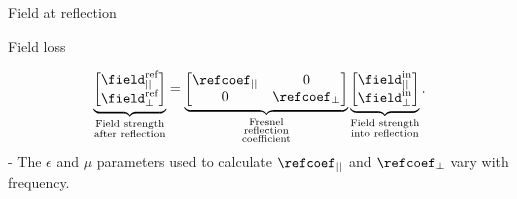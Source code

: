 \documentclass[8pt]{beamer}
\begin{document}
\begin{frame}{Field at reflection}
\begin{block}{Field loss}
\begin{minipage}{\twocols}
\begin{equation*}
\underbrace{\begin{bmatrix}
\field^{\text{ref}}_{||} \\ \field^{\text{ref}}_{\perp}
\end{bmatrix}}_{\substack{\text{Field strength} \\ \text{after reflection}}}=\underbrace{
\begin{bmatrix} \refcoef_{||} & 0 \\ 0 & \refcoef_{\perp}  \end{bmatrix}}_{\substack{\text{Fresnel} \\ \text{reflection} \\ \text{coefficient}}}\underbrace{\begin{bmatrix} \field^{\text{in}}_{||} \\ \field^{\text{in}}_{\perp}
\end{bmatrix}}_{\substack{\text{Field strength} \\ \text{into reflection}}}.
\end{equation*}
- The $\epsilon$ and $\mu$ parameters used to calculate $\refcoef_{||}$ and $\refcoef_{\perp}$ vary with frequency.
\end{minipage}
\end{block}
 \end{frame}
\end{document}
